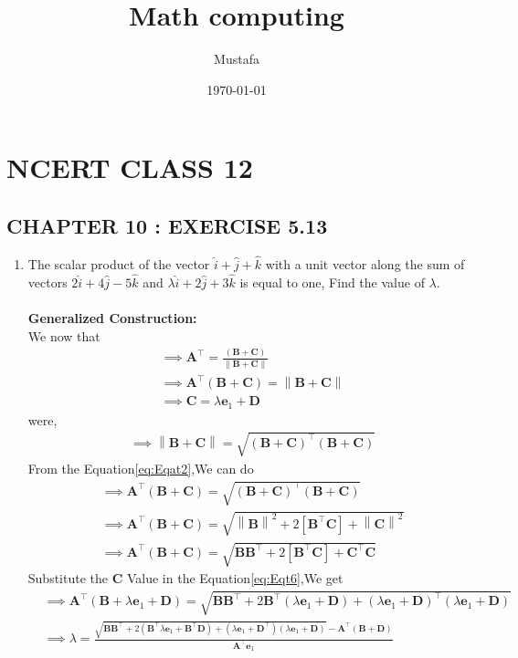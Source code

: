 \documentclass[11pt, a4paper]{article}
\title{ Math computing}
\author{ Mustafa}
\date{\today}
\let\vec\mathbf
\providecommand{\brak}[1]{\ensuremath{\left(#1\right)}}
\providecommand{\sbrak}[1]{\ensuremath{{}\left[#1\right]}}
\providecommand{\norm}[1]{\left\lVert#1\right\rVert}
\begin{document}
\section*{NCERT CLASS 12}
\subsection*{CHAPTER 10 : EXERCISE 5.13}
\begin{enumerate}
\item\textbf{}The scalar product of the vector $\hat{i}+\hat{j}+\hat{k}$ with a unit vector along the sum of vectors $2\hat{i}+4\hat{j}-5\hat{k}$ and $\lambda\hat{i}+2\hat{j}+3\hat{k}$ is equal to one, Find the value of $\lambda$.
\\\\
\textbf{Generalized Construction:}\\
We now that \\
\begin{align}
   &\implies \vec{A}^\top = \frac{\brak{\vec{B}+\vec{C}}}{\norm{\vec{B}+\vec{C}}}\\
       &\implies \vec{A}^\top \brak{\vec{B}+\vec{C}}=\norm{\vec{B}+\vec{C}} \label{eq:Eqat2}\\
       &\implies \vec{C}=\lambda\vec{e}_1+\vec{D}\label{eq:EQT-C}
    \end{align}
    were,
    \begin{align}
       &\implies \norm{\vec{B}+\vec{C}}= \sqrt{\brak{\vec{B}+\vec{C}}^\top\brak{\vec{B}+\vec{C}}}
    \end{align}
From the Equation\eqref{eq:Eqat2},We can do
\begin{align}
   &\implies \vec{A}^\top \brak{\vec{B}+\vec{C}}=\sqrt{\brak{\vec{B}+\vec{C}}^\top\brak{\vec{B}+\vec{C}}}\\
&\implies \vec{A}^\top \brak{\vec{B}+\vec{C}}=\sqrt{\norm{\vec{B}}^2+2\sbrak{\vec{B}^{\top}\vec{C}}+\norm{\vec{C}}^2}\\
&\implies \vec{A}^\top \brak{\vec{B}+\vec{C}}=\sqrt{{\vec{B}\vec{B}^{\top}}+2\sbrak{\vec{B}^{\top}\vec{C}}+{\vec{C}^\top\vec{C}}}\label{eq:Eqt6}
\end{align}
Substitute the $\vec{C}$ Value in the Equation\eqref{eq:Eqt6},We get
\begin{align}
&\implies\vec{A}^{\top}\brak{\vec{B}+\lambda\vec{e}_1+\vec{D}}=\sqrt{\vec{B}\vec{B}^{\top}+2\vec{B}^{\top}\brak{\lambda\vec{e}_1+\vec{D}}+\brak{\lambda\vec{e}_1+\vec{D}}^{\top}\brak{\lambda\vec{e}_1+\vec{D}}}\\
&\implies\lambda=\frac{\sqrt{\vec{B}\vec{B}^{\top}+2\brak{\vec{B}^{\top}\lambda\vec{e}_1+\vec{B}^{\top}\vec{D}}+\brak{\lambda\vec{e}_1+\vec{D}^{\top}}\brak{\lambda\vec{e}_1+\vec{D}}}-\vec{A}^\top\brak{\vec{B}+\vec{D}}}{\vec{A}^{\top}\vec{e}_1} \label{eq:final}

\end{align}
\end{enumerate}
\end{document}
